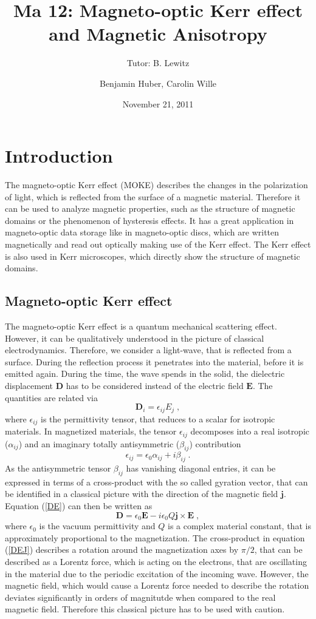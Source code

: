 \documentclass[a4paper]{scrartcl}
\title{Ma 12: Magneto-optic Kerr effect and Magnetic Anisotropy}
\subtitle{Tutor: B. Lewitz}
\author{Benjamin Huber, Carolin Wille}
\date{November 21, 2011}
\numberwithin{equation}{section}
\numberwithin{figure}{section}
\numberwithin{table}{section}
\newcommand{\eq}[2]{\begin{equation}#1\label{#2}\end{equation}}
\newcommand{\Formel}[1]{(\ref{#1})}
\newcommand{\ve}[1]{\mathbf{ #1} }
\begin{document}
\thispagestyle{empty}
\maketitle
\tableofcontents
\clearpage


\section{Introduction}
The magneto-optic Kerr effect (MOKE) describes the changes in the polarization of light, which is reflected from the surface of a magnetic material. Therefore it can be used to analyze magnetic properties, such as the structure of magnetic domains or the phenomenon of hysteresis effects. It has a great application in magneto-optic data storage like in magneto-optic discs, which are written magnetically and read out optically making use of the Kerr effect. The Kerr effect is also used in Kerr microscopes, which directly show the structure of magnetic domains.

\subsection{Magneto-optic Kerr effect}
The magneto-optic Kerr effect is a quantum mechanical scattering effect. However, it can be qualitatively understood in the picture of classical electrodynamics. Therefore, we consider a light-wave, that is reflected from a surface. During the reflection process it
 penetrates into the material, before it is emitted again. During the time, the wave spends in the solid, the dielectric displacement $\ve D $ has to be considered instead of the electric field $\ve E$. The quantities are related via
\eq{\ve D_i = \epsilon_{ij} E_j \;, } {DE}
where $ \epsilon_{ij}$ is the permittivity tensor, that reduces to a scalar for isotropic materials. In magnetized materials, the tensor $\epsilon_{ij}$ decomposes into a real isotropic ($\alpha_{ij}$) and an imaginary totally antisymmetric ($\beta_{ij}$) contribution
\eq{\epsilon_{ij} = \epsilon_0 \alpha_{ij} + i \beta_{ij} \; . }{eps}
As the antisymmetric tensor $\beta_{ij}$ has vanishing diagonal entries, it can be expressed in terms of a cross-product with the so called gyration vector, that can be identified in a classical picture with the direction of the magnetic field $\ve j$. Equation \Formel{DE} can then be written as
\eq{\ve D = \epsilon_0 \ve E - i \epsilon_0 Q \ve j \times \ve E \; , }{DEJ}
where $\epsilon_0$ is the vacuum permittivity and $Q$ is a complex material constant, that is approximately proportional to the magnetization. The cross-product in equation \Formel{DEJ} describes a rotation around the magnetization axes by $\pi/2$, that can be described as a Lorentz force, which is acting on the electrons, that are oscillating in the material due to the periodic excitation of the incoming wave. However, the magnetic field, which would cause a Lorentz force needed to describe the rotation deviates significantly in orders of magnitutde when compared to the real magnetic field. Therefore this classical picture has to be used with caution.
\end{document}
